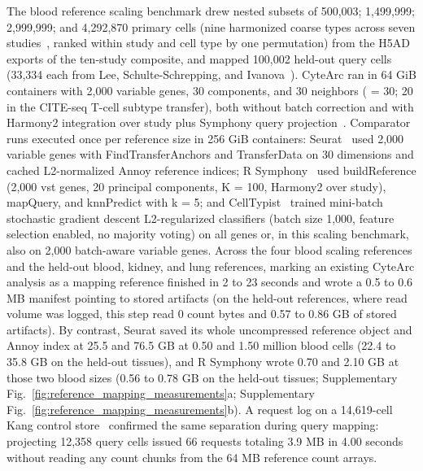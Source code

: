 The blood reference scaling benchmark drew nested subsets of 500,003; 1,499,999; 2,999,999; and 4,292,870 primary cells (nine harmonized coarse types across seven studies~\cite{hao2021,stephenson2021singlecell,combat2022blood,yazar2022singlecell,binvignat2024,rabadam2024coordinated,kock2025asian}, ranked within study and cell type by one permutation) from the H5AD exports of the ten-study composite, and mapped 100,002 held-out query cells (33,334 each from Lee, Schulte-Schrepping, and Ivanova~\cite{lee2020immunophenotyping,schulteschrepping2020severe,jin2021interactive,ivanova2023mrna}). CyteArc ran in 64 GiB containers with 2,000 variable genes, 30 components, and 30 neighbors ( = 30; 20 in the CITE-seq T-cell subtype transfer), both without batch correction and with Harmony2 integration over study plus Symphony query projection~\cite{patikas2026integration,kang2021}. Comparator runs executed once per reference size in 256 GiB containers: Seurat~\cite{stuart2019} used 2,000 variable genes with FindTransferAnchors and TransferData on 30 dimensions and cached L2-normalized Annoy reference indices; R Symphony~\cite{kang2021} used buildReference (2,000 vst genes, 20 principal components, K = 100, Harmony2 over study), mapQuery, and knnPredict with k = 5; and CellTypist~\cite{dominguez2022} trained mini-batch stochastic gradient descent L2-regularized classifiers (batch size 1,000, feature selection enabled, no majority voting) on all genes or, in this scaling benchmark, also on 2,000 batch-aware  variable genes. Across the four blood scaling references and the held-out blood, kidney, and lung references, marking an existing CyteArc analysis as a mapping reference finished in 2 to 23 seconds and wrote a 0.5 to 0.6 MB manifest pointing to stored artifacts (on the held-out references, where read volume was logged, this step read 0 count bytes and 0.57 to 0.86 GB of stored artifacts). By contrast, Seurat saved its whole uncompressed reference object and Annoy index at 25.5 and 76.5 GB at 0.50 and 1.50 million blood cells (22.4 to 35.8 GB on the held-out tissues), and R Symphony wrote 0.70 and 2.10 GB at those two blood sizes (0.56 to 0.78 GB on the held-out tissues; Supplementary Fig.~\ref{fig:reference_mapping_measurements}a; Supplementary Fig.~\ref{fig:reference_mapping_measurements}b). A request log on a 14,619-cell Kang control store~\cite{kang2018} confirmed the same separation during query mapping: projecting 12,358 query cells issued 66 requests totaling 3.9 MB in 4.00 seconds without reading any count chunks from the 64 MB reference count arrays.


